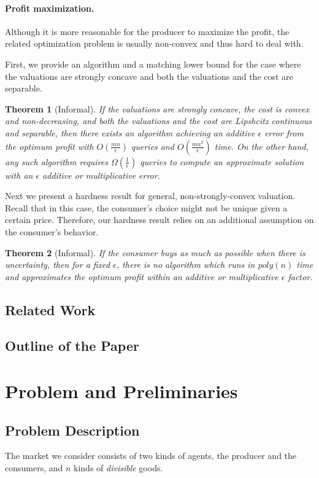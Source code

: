 \documentclass{article}
\newtheorem{theorem}{Theorem}[section]
\begin{document}
\paragraph{Profit maximization.}
Although it is more reasonable for the producer to maximize the profit, the related optimization problem is usually non-convex and thus hard to deal with.

First, we provide an algorithm and a matching lower bound for the case where the valuations are strongly concave and both the valuations and the cost are separable.
\begin{theorem}[Informal]
    If the valuations are strongly concave, the cost is convex and non-decreasing, and both the valuations and the cost are Lipshcitz continuous and separable, then there exists an algorithm achieving an additive $\epsilon$ error from the optimum profit with $O(\frac{mn}{\epsilon})$ queries and $O(\frac{mn^2}{\epsilon})$ time. On the other hand, any such algorithm requires $\Omega(\frac{1}{\epsilon})$ queries to compute an approximate solution with an $\epsilon$ additive or multiplicative error.
\end{theorem}

Next we present a hardness result for general, non-strongly-convex valuation. Recall that in this case, the consumer's choice might not be unique given a certain price. Therefore, our hardness result relies on an additional assumption on the consumer's behavior.
\begin{theorem}[Informal]
    If the consumer buys as much as possible when there is uncertainty, then for a fixed $\epsilon$, there is no algorithm which runs in $poly(n)$ time and approximates the optimum profit within an additive or multiplicative $\epsilon$ factor.
\end{theorem}

\subsection{Related Work}

\subsection{Outline of the Paper}

\section{Problem and Preliminaries}
\subsection{Problem Description}
The market we consider consists of two kinds of agents, the producer and the consumers, and $n$ kinds of \emph{divisible} goods. \\
\end{document}
